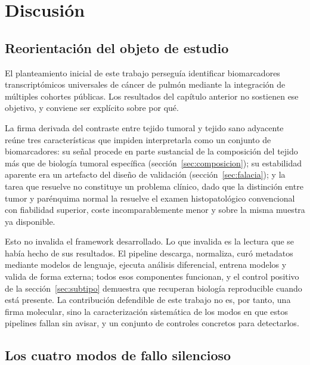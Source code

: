 
\section{Discusión}
\label{cap:discusion}

\subsection{Reorientación del objeto de estudio}
\label{sec:disc-reorientacion}

El planteamiento inicial de este trabajo perseguía identificar biomarcadores
transcriptómicos universales de cáncer de pulmón mediante la integración de
múltiples cohortes públicas. Los resultados del capítulo anterior no sostienen
ese objetivo, y conviene ser explícito sobre por qué.

La firma derivada del contraste entre tejido tumoral y tejido sano adyacente
reúne tres características que impiden interpretarla como un conjunto de
biomarcadores: su señal procede en parte sustancial de la composición del tejido
más que de biología tumoral específica (sección~\ref{sec:composicion}); su
estabilidad aparente era un artefacto del diseño de validación
(sección~\ref{sec:falacia}); y la tarea que resuelve no constituye un problema
clínico, dado que la distinción entre tumor y parénquima normal la resuelve el
examen histopatológico convencional con fiabilidad superior, coste
incomparablemente menor y sobre la misma muestra ya disponible.

Esto no invalida el framework desarrollado. Lo que invalida es la lectura que se
había hecho de sus resultados. El pipeline descarga, normaliza, curó
metadatos mediante modelos de lenguaje, ejecuta análisis diferencial, entrena
modelos y valida de forma externa; todos esos componentes funcionan, y el
control positivo de la sección~\ref{sec:subtipo} demuestra que recuperan biología
reproducible cuando está presente. La contribución defendible de este trabajo no
es, por tanto, una firma molecular, sino la caracterización sistemática de los
modos en que estos pipelines fallan sin avisar, y un conjunto de controles
concretos para detectarlos.

\subsection{Los cuatro modos de fallo silencioso}
\label{sec:disc-fallos}

